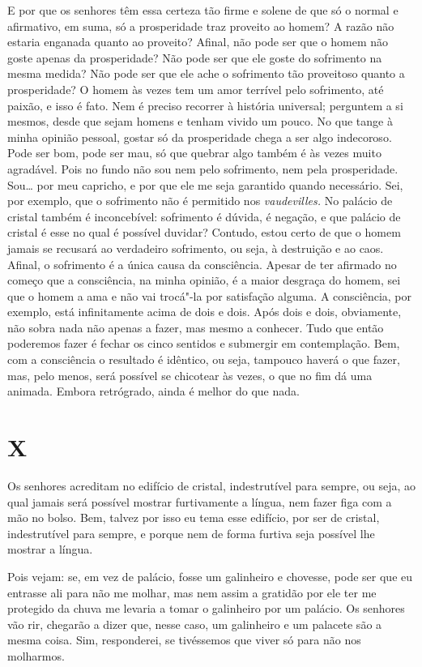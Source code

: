 E por que os senhores têm essa certeza tão firme e solene de que só o
normal e afirmativo, em suma, só a prosperidade traz proveito ao homem?
A razão não estaria enganada quanto ao proveito? Afinal, não pode ser
que o homem não goste apenas da prosperidade? Não pode ser que ele goste
do sofrimento na mesma medida? Não pode ser que ele ache o sofrimento
tão proveitoso quanto a prosperidade? O homem às vezes tem um amor
terrível pelo sofrimento, até paixão, e isso é fato. Nem é preciso
recorrer à história universal; perguntem a si mesmos, desde que sejam
homens e tenham vivido um pouco. No que tange à minha opinião pessoal,
gostar só da prosperidade chega a ser algo indecoroso. Pode ser bom,
pode ser mau, só que quebrar algo também é às vezes muito agradável.
Pois no fundo não sou nem pelo sofrimento, nem pela prosperidade. Sou\ldots{}
por meu capricho, e por que ele me seja garantido quando necessário.
Sei, por exemplo, que o sofrimento não é permitido nos
\emph{vaudevilles.} No palácio de cristal também é inconcebível:
sofrimento é dúvida, é negação, e que palácio de cristal é esse no qual
é possível duvidar? Contudo, estou certo de que o homem jamais se
recusará ao verdadeiro sofrimento, ou seja, à destruição e ao caos.
Afinal, o sofrimento é a única causa da consciência. Apesar de ter
afirmado no começo que a consciência, na minha opinião, é a maior
desgraça do homem, sei que o homem a ama e não vai trocá"-la por
satisfação alguma. A consciência, por exemplo, está infinitamente acima
de dois e dois. Após dois e dois, obviamente, não sobra nada não apenas
a fazer, mas mesmo a conhecer. Tudo que então poderemos fazer é fechar
os cinco sentidos e submergir em contemplação. Bem, com a consciência o
resultado é idêntico, ou seja, tampouco haverá o que fazer, mas, pelo
menos, será possível se chicotear às vezes, o que no fim dá uma animada.
Embora retrógrado, ainda é melhor do que nada.

\section{X}

Os senhores acreditam no edifício de cristal, indestrutível para sempre,
ou seja, ao qual jamais será possível mostrar furtivamente a língua, nem
fazer figa com a mão no bolso. Bem, talvez por isso eu tema esse
edifício, por ser de cristal, indestrutível para sempre, e porque nem de
forma furtiva seja possível lhe mostrar a língua.

Pois vejam: se, em vez de palácio, fosse um galinheiro e chovesse, pode
ser que eu entrasse ali para não me molhar, mas nem assim a gratidão por
ele ter me protegido da chuva me levaria a tomar o galinheiro por um
palácio. Os senhores vão rir, chegarão a dizer que, nesse caso, um
galinheiro e um palacete são a mesma coisa. Sim, responderei, se
tivéssemos que viver só para não nos molharmos.

